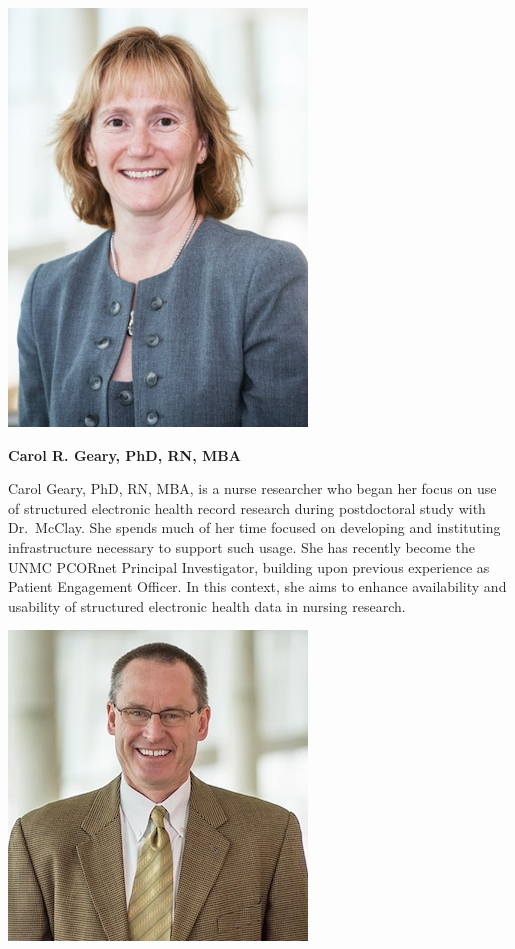 \documentclass[
]{journal}
\begin{document}
\begin{flushleft}\includegraphics[width=0.5\linewidth]{assets/biography/carol_geary} \end{flushleft}

\textbf{Carol R. Geary, PhD, RN, MBA}

Carol Geary, PhD, RN, MBA, is a nurse researcher who began her focus on use of structured electronic health record research during postdoctoral study with Dr.~McClay. She spends much of her time focused on developing and instituting infrastructure necessary to support such usage. She has recently become the UNMC PCORnet Principal Investigator, building upon previous experience as Patient Engagement Officer. In this context, she aims to enhance availability and usability of structured electronic health data in nursing research.

\begin{flushleft}\includegraphics[width=0.5\linewidth]{assets/biography/scott_campbell} \end{flushleft}
\end{document}
